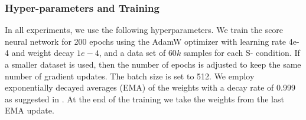 \subsubsection{Hyper-parameters {and Training}}\label{apx:param}
In all experiments, we use the following hyperparameters. We train the score neural network for  200 epochs using the AdamW \cite{loshchilov2018decoupled} optimizer with learning rate 4e-4 and weight decay $1e-4$, %
and a data set of $60k$ samples for each S- condition.%
If a smaller dataset is used, then the number of epochs is adjusted to keep the same
number of gradient updates.
The batch size is set to 512. We employ exponentially decayed averages (EMA) of the weights with a decay rate of 0.999 as suggested in \cite{song2020improved}. At the end of the training we take the weights from the last EMA update. 
